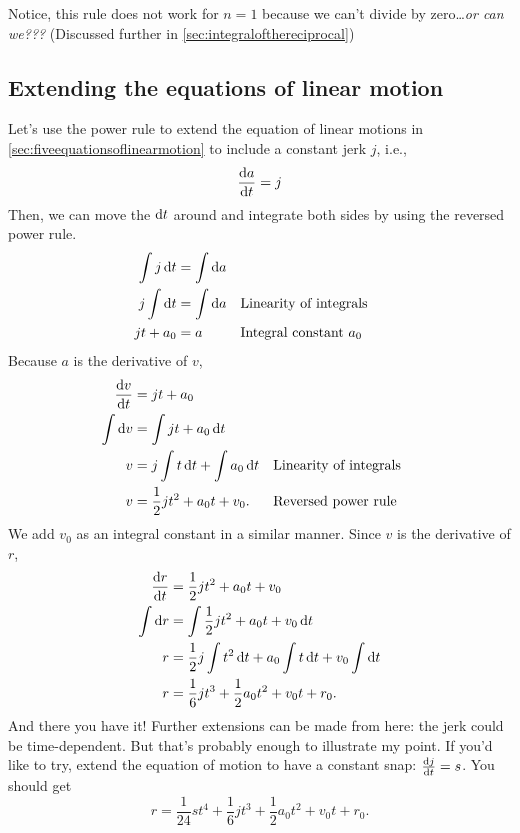 Notice, this rule does not work for $n = 1$ because we can't divide by zero\dots \emph{or can we???} (Discussed further in \cref{sec:integralofthereciprocal})

\subsection{Extending the equations of linear motion}

Let's use the power rule to extend the equation of linear motions in \cref{sec:fiveequationsoflinearmotion} to include a constant jerk $j$, i.e.,
\begin{equation}
    \odv{a}{t} = j
\end{equation}
Then, we can move the $\odif{t}$ around and integrate both sides by using the reversed power rule.
\begin{align*}
    \int j\odif{t} &= \int\odif{a} \\
    j\int \odif{t} &= \int\odif{a} \alc[0.3]{Linearity of integrals} \\
    jt + a_0 &= a \alc[0.3]{Integral constant $a_0$}
\end{align*}
Because $a$ is the derivative of $v$, 
\begin{align*}
    \odv{v}{t} &= jt + a_0 \\
    \int \odif{v} &= \int jt + a_0 \odif{t} \\
    v &= j\int t\odif{t} + \int a_0\odif{t} \alc{Linearity of integrals} \\
    v &= \frac{1}{2}jt^2 + a_0t + v_0. \alc{Reversed power rule}
\end{align*}
We add $v_0$ as an integral constant in a similar manner. Since $v$ is the derivative of $r$,
\begin{align*}
    \odv{r}{t} &= \frac{1}{2}jt^2 + a_0t + v_0 \\
    \int \odif{r} &= \int\frac{1}{2}jt^2 + a_0t + v_0 \odif{t} \\
    r &= \frac{1}{2}j\int t^2\odif{t} + a_0\int t\odif{t} + v_0\int\odif{t} \\
    r &= \frac{1}{6}jt^3 + \frac{1}{2}a_0t^2 + v_0t + r_0.
\end{align*}
And there you have it! Further extensions can be made from here: the jerk could be time-dependent. But that's probably enough to illustrate my point. If you'd like to try, extend the equation of motion to have a constant snap: $\odv{j}{t} = s$. You should get
\begin{equation*}
    r = \frac{1}{24}st^4 + \frac{1}{6}jt^3 + \frac{1}{2}a_0t^2 + v_0t + r_0.
\end{equation*}


